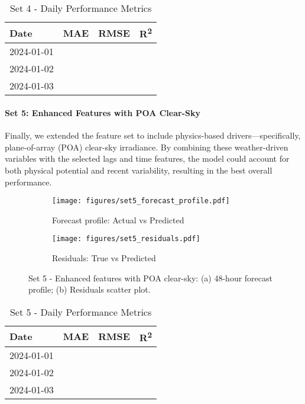 \begin{table}[H]
    \centering
    \caption{Set 4 - Daily Performance Metrics}
    \begin{tabular}{lccc}
        \toprule
        Date        & MAE    & RMSE   & R\textsuperscript{2} \\
        \midrule
        2024-01-01  &        &        &       \\
        2024-01-02  &        &        &       \\
        2024-01-03  &        &        &       \\
        \bottomrule
    \end{tabular}
\end{table}

\paragraph{Set 5: Enhanced Features with POA Clear-Sky}
Finally, we extended the feature set to include physics-based drivers—specifically, 
plane-of-array (POA) clear-sky irradiance. By combining these weather-driven variables 
with the selected lags and time features, the model could account for both physical 
potential and recent variability, resulting in the best overall performance.

\begin{figure}[H]
    \centering
    \begin{subfigure}{0.49\textwidth}
        \texttt{[image: figures/set5\_forecast\_profile.pdf]}
        \caption{Forecast profile: Actual vs Predicted}
    \end{subfigure}
    \begin{subfigure}{0.49\textwidth}
        \texttt{[image: figures/set5\_residuals.pdf]}
        \caption{Residuals: True vs Predicted}
    \end{subfigure}
    \caption{Set 5 - Enhanced features with POA clear-sky: (a) 48-hour forecast profile; 
    (b) Residuals scatter plot.}
\end{figure}

\begin{table}[H]
    \centering
    \caption{Set 5 - Daily Performance Metrics}
    \begin{tabular}{lccc}
        \toprule
        Date        & MAE    & RMSE   & R\textsuperscript{2} \\
        \midrule
        2024-01-01  &        &        &       \\
        2024-01-02  &        &        &       \\
        2024-01-03  &        &        &       \\
        \bottomrule
    \end{tabular}
\end{table}

